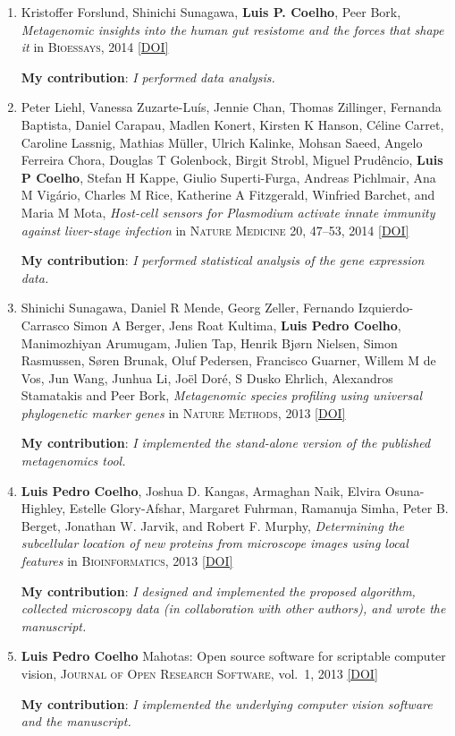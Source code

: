 \documentclass{article}
\newcommand\showdoi[1]{%
    \href{http://dx.doi.org/#1}{[DOI]}%
}
\newcommand\pubname[1]{\textsc{#1}}
\newcommand\contribution[1]{\relax\hfill\break\textbf{My contribution}: \textit{#1}}
\begin{document}
\begin{enumerate}[resume]
\item Kristoffer Forslund, Shinichi Sunagawa, \textbf{Luis P. Coelho}, Peer
Bork, \emph{Metagenomic insights into the human gut resistome and the forces that
shape it} in \pubname{Bioessays}, 2014 \showdoi{10.1002/bies.201300143}
\contribution{I performed data analysis.}

\item Peter Liehl, Vanessa Zuzarte-Luís, Jennie Chan, Thomas Zillinger,
Fernanda Baptista, Daniel Carapau, Madlen Konert, Kirsten K Hanson, Céline
Carret, Caroline Lassnig, Mathias Müller, Ulrich Kalinke, Mohsan Saeed,
Angelo Ferreira Chora, Douglas T Golenbock, Birgit Strobl, Miguel Prudêncio,
\textbf{Luis P Coelho}, Stefan H Kappe, Giulio Superti-Furga, Andreas
Pichlmair, Ana M Vigário, Charles M Rice, Katherine A Fitzgerald, Winfried
Barchet, and Maria M Mota, \emph{Host-cell sensors for Plasmodium activate
innate immunity against liver-stage infection} in \pubname{Nature Medicine} 20,
47--53, 2014 \showdoi{10.1038/nm.3424}
\contribution{I performed statistical analysis of the gene expression data.}

\item Shinichi Sunagawa, Daniel R Mende, Georg Zeller, Fernando
Izquierdo-Carrasco Simon A Berger, Jens Roat Kultima, \textbf{Luis Pedro
Coelho}, Manimozhiyan Arumugam, Julien Tap, Henrik Bjørn Nielsen, Simon
Rasmussen, Søren Brunak, Oluf Pedersen, Francisco Guarner, Willem M de Vos,
Jun Wang, Junhua Li, Joël Doré, S Dusko Ehrlich, Alexandros Stamatakis and
Peer Bork, \emph{Metagenomic species profiling using universal phylogenetic
marker genes} in \pubname{Nature Methods}, 2013 \showdoi{10.1038/nmeth.2693}
\contribution{I implemented the stand-alone version of the published metagenomics tool.}

\item \textbf{Luis Pedro Coelho}, Joshua D. Kangas, Armaghan Naik, Elvira
Osuna-Highley, Estelle Glory-Afshar, Margaret Fuhrman, Ramanuja Simha, Peter B.
Berget, Jonathan W. Jarvik, and Robert F. Murphy, \emph{Determining the
subcellular location of new proteins from microscope images using local
features} in \pubname{Bioinformatics}, 2013 \showdoi{10.1093/bioinformatics/btt392}
\contribution{I designed and implemented the proposed algorithm, collected
microscopy data (in collaboration with other authors), and wrote the
manuscript.}

\item \textbf{Luis Pedro Coelho} Mahotas: Open source software for scriptable
computer vision, \pubname{Journal of Open Research Software}, vol.\ 1, 2013
\showdoi{10.5334/jors.ac}
\contribution{I implemented the underlying computer vision software and the manuscript.}


\end{enumerate}
\end{document}
